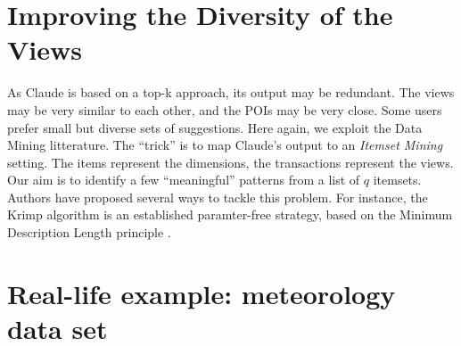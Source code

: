 \section{Improving the Diversity of the Views}
As Claude is based on a top-k approach, its output may be redundant.  The views
may be very similar to each other, and the POIs may be very close.  Some users
prefer small but diverse sets of suggestions. Here again, we exploit the Data
Mining litterature. The ``trick'' is to map Claude's output to an \emph{Itemset
Mining} setting.  The items represent the dimensions, the transactions
represent the views. Our aim is to identify a few ``meaningful'' patterns from
a list of $q$ itemsets. Authors have proposed several ways to tackle this
problem. For instance, the Krimp algorithm is an established paramter-free
strategy, based on the Minimum Description Length principle
\cite{vreeken2011krimp}.


\section{Real-life example: meteorology data set}

